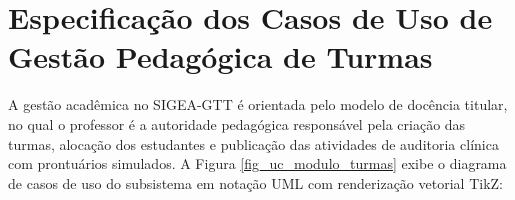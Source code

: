 \chapter{Especificação dos Casos de Uso de Gestão Pedagógica de Turmas}
\label{cap_gestao_turmas}

A gestão acadêmica no SIGEA-GTT é orientada pelo modelo de docência titular, no qual o professor é a autoridade pedagógica responsável pela criação das turmas, alocação dos estudantes e publicação das atividades de auditoria clínica com prontuários simulados. A Figura \ref{fig_uc_modulo_turmas} exibe o diagrama de casos de uso do subsistema em notação UML com renderização vetorial TikZ:

